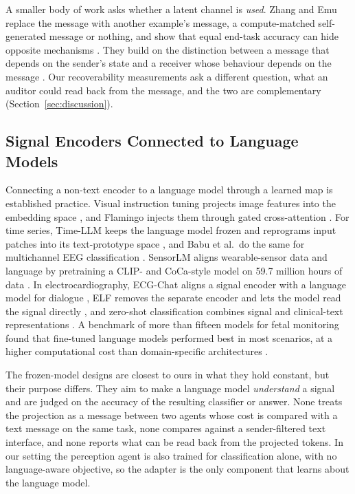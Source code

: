 A smaller body of work asks whether a latent channel is \emph{used}. Zhang and Emu replace the message with another example's message, a compute-matched self-generated message or nothing, and show that equal end-task accuracy can hide opposite mechanisms \cite{zhang2026causalaudit}. They build on the distinction between a message that depends on the sender's state and a receiver whose behaviour depends on the message \cite{lowe2019pitfalls}. Our recoverability measurements ask a different question, what an auditor could read back from the message, and the two are complementary (Section~\ref{sec:discussion}).

\subsection{Signal Encoders Connected to Language Models}
Connecting a non-text encoder to a language model through a learned map is established practice. Visual instruction tuning projects image features into the embedding space \cite{liu2023llava}, and Flamingo injects them through gated cross-attention \cite{alayrac2022flamingo}. For time series, Time-LLM keeps the language model frozen and reprograms input patches into its text-prototype space \cite{jin2024timellm}, and Babu et al.\ do the same for multichannel EEG classification \cite{babu2025modality}. SensorLM aligns wearable-sensor data and language by pretraining a CLIP- and CoCa-style model on 59.7 million hours of data \cite{zhang2025sensorlm}. In electrocardiography, ECG-Chat aligns a signal encoder with a language model for dialogue \cite{zhao2025ecgchat}, ELF removes the separate encoder and lets the model read the signal directly \cite{han2026encoderfree}, and zero-shot classification combines signal and clinical-text representations \cite{liu2024zeroshot}. A benchmark of more than fifteen models for fetal monitoring found that fine-tuned language models performed best in most scenarios, at a higher computational cost than domain-specific architectures \cite{wong2025llms}.

The frozen-model designs are closest to ours in what they hold constant, but their purpose differs. They aim to make a language model \emph{understand} a signal and are judged on the accuracy of the resulting classifier or answer. None treats the projection as a message between two agents whose cost is compared with a text message on the same task, none compares against a sender-filtered text interface, and none reports what can be read back from the projected tokens. In our setting the perception agent is also trained for classification alone, with no language-aware objective, so the adapter is the only component that learns about the language model.

